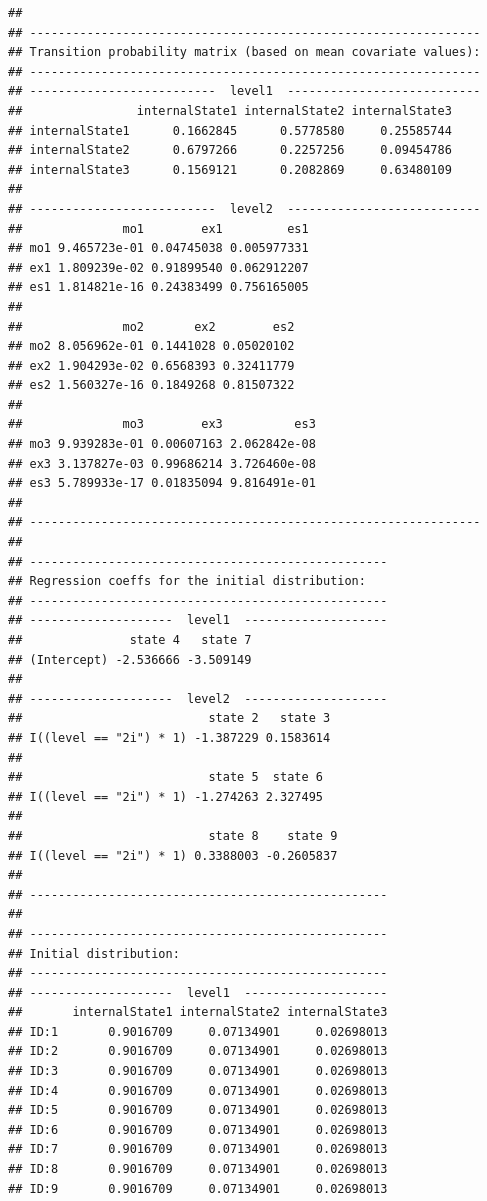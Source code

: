 \documentclass[12pt]{article}\usepackage[]{graphicx}\usepackage[]{xcolor}
\makeatletter
\newenvironment{kframe}{%
 \def\at@end@of@kframe{}%
 \ifinner\ifhmode%
  \def\at@end@of@kframe{\end{minipage}}%
  \begin{minipage}{\columnwidth}%
 \fi\fi%
 \def\FrameCommand##1{\hskip\@totalleftmargin \hskip-\fboxsep
 \colorbox{shadecolor}{##1}\hskip-\fboxsep
     \hskip-\linewidth \hskip-\@totalleftmargin \hskip\columnwidth}%
 \MakeFramed {\advance\hsize-\width
   \@totalleftmargin\z@ \linewidth\hsize
   \@setminipage}}%
 {\par\unskip\endMakeFramed%
 \at@end@of@kframe}
\newenvironment{knitrout}{}{} %
\makeatother
\begin{document}
\begin{knitrout}
\begin{kframe}
\begin{verbatim}
## 
## ---------------------------------------------------------------
## Transition probability matrix (based on mean covariate values):
## ---------------------------------------------------------------
## --------------------------  level1  ---------------------------
##                internalState1 internalState2 internalState3
## internalState1      0.1662845      0.5778580     0.25585744
## internalState2      0.6797266      0.2257256     0.09454786
## internalState3      0.1569121      0.2082869     0.63480109
## 
## --------------------------  level2  ---------------------------
##              mo1        ex1         es1
## mo1 9.465723e-01 0.04745038 0.005977331
## ex1 1.809239e-02 0.91899540 0.062912207
## es1 1.814821e-16 0.24383499 0.756165005
## 
##              mo2       ex2        es2
## mo2 8.056962e-01 0.1441028 0.05020102
## ex2 1.904293e-02 0.6568393 0.32411779
## es2 1.560327e-16 0.1849268 0.81507322
## 
##              mo3        ex3          es3
## mo3 9.939283e-01 0.00607163 2.062842e-08
## ex3 3.137827e-03 0.99686214 3.726460e-08
## es3 5.789933e-17 0.01835094 9.816491e-01
## 
## ---------------------------------------------------------------
## 
## --------------------------------------------------
## Regression coeffs for the initial distribution:
## --------------------------------------------------
## --------------------  level1  --------------------
##               state 4   state 7
## (Intercept) -2.536666 -3.509149
## 
## --------------------  level2  --------------------
##                          state 2   state 3
## I((level == "2i") * 1) -1.387229 0.1583614
## 
##                          state 5  state 6
## I((level == "2i") * 1) -1.274263 2.327495
## 
##                          state 8    state 9
## I((level == "2i") * 1) 0.3388003 -0.2605837
## 
## --------------------------------------------------
## 
## --------------------------------------------------
## Initial distribution:
## --------------------------------------------------
## --------------------  level1  --------------------
##       internalState1 internalState2 internalState3
## ID:1       0.9016709     0.07134901     0.02698013
## ID:2       0.9016709     0.07134901     0.02698013
## ID:3       0.9016709     0.07134901     0.02698013
## ID:4       0.9016709     0.07134901     0.02698013
## ID:5       0.9016709     0.07134901     0.02698013
## ID:6       0.9016709     0.07134901     0.02698013
## ID:7       0.9016709     0.07134901     0.02698013
## ID:8       0.9016709     0.07134901     0.02698013
## ID:9       0.9016709     0.07134901     0.02698013

\end{verbatim}
\end{kframe}
\end{knitrout}
\end{document}
